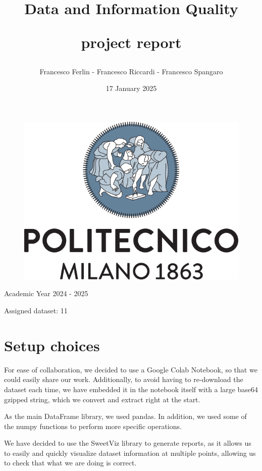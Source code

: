 \documentclass{article}
\title{\Huge{
\begin{center}
    \textbf{Data and Information Quality}
\end{center}
\begin{center}
    \textbf{project report}
\end{center}
}}
\author{\Large{Francesco Ferlin - Francesco Riccardi - Francesco Spangaro}}
\date{17 January 2025}
\begin{document}
\maketitle

\begin{figure}[h]
    \centering
    \includegraphics[scale=0.6]{politecnico-di-milano-logo.png}
\end{figure}

\begin{center}
      \large{Academic Year 2024 - 2025}
\end{center}
\begin{center}
    \large{Assigned dataset: 11}
\end{center}

\tableofcontents

\newpage
\pagestyle{PageStyle}
\section{Setup choices}
For ease of collaboration, we decided to use a Google Colab Notebook, so that we could easily share our work. Additionally, to avoid having to re-download the dataset each time, we have embedded it in the notebook itself with a large base64 gzipped string, which we convert and extract right at the start.

As the main DataFrame library, we used pandas. In addition, we used some of the numpy functions to perform more specific operations.

We have decided to use the SweetViz library to generate reports, as it allows us to easily and quickly visualize dataset information at multiple points, allowing us to check that what we are doing is correct.
\end{document}
